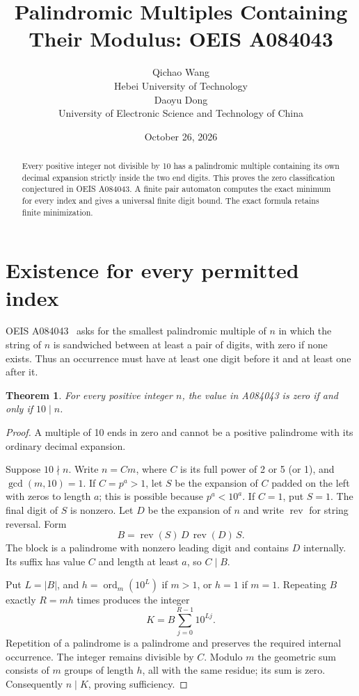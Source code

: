 \documentclass[10pt]{article}
\title{Palindromic Multiples Containing Their Modulus: OEIS A084043}
\author{Qichao Wang\\{\small Hebei University of Technology}\\[0.3em]
Daoyu Dong\\{\small University of Electronic Science and Technology of China}}
\date{October 26, 2026}
\newtheorem{theorem}{Theorem}
\begin{document}
\maketitle
\begin{abstract}
Every positive integer not divisible by 10 has a palindromic multiple containing its own decimal expansion strictly inside the two end digits. This proves the zero classification conjectured in OEIS A084043. A finite pair automaton computes the exact minimum for every index and gives a universal finite digit bound. The exact formula retains finite minimization.
\end{abstract}
\section{Existence for every permitted index}
OEIS A084043~\cite{oeis} asks for the smallest palindromic multiple of $n$ in which the string of $n$ is sandwiched between at least a pair of digits, with zero if none exists. Thus an occurrence must have at least one digit before it and at least one after it.
\begin{theorem}
For every positive integer $n$, the value in A084043 is zero if and only if $10\mid n$.
\end{theorem}
\begin{proof}
A multiple of 10 ends in zero and cannot be a positive palindrome with its ordinary decimal expansion.

Suppose $10\nmid n$. Write $n=Cm$, where $C$ is its full power of 2 or 5 (or 1), and $\gcd(m,10)=1$. If $C=p^a>1$, let $S$ be the expansion of $C$ padded on the left with zeros to length $a$; this is possible because $p^a<10^a$. If $C=1$, put $S=1$. The final digit of $S$ is nonzero. Let $D$ be the expansion of $n$ and write $\operatorname{rev}$ for string reversal. Form
\[
 B=\operatorname{rev}(S)\,D\,\operatorname{rev}(D)\,S.
\]
The block is a palindrome with nonzero leading digit and contains $D$ internally. Its suffix has value $C$ and length at least $a$, so $C\mid B$.

Put $L=|B|$, and $h=\operatorname{ord}_m(10^L)$ if $m>1$, or $h=1$ if $m=1$. Repeating $B$ exactly $R=mh$ times produces the integer
\[
 K=B\sum_{j=0}^{R-1}10^{Lj}.
\]
Repetition of a palindrome is a palindrome and preserves the required internal occurrence. The integer remains divisible by $C$. Modulo $m$ the geometric sum consists of $m$ groups of length $h$, all with the same residue; its sum is zero. Consequently $n\mid K$, proving sufficiency.
\end{proof}
\end{document}
